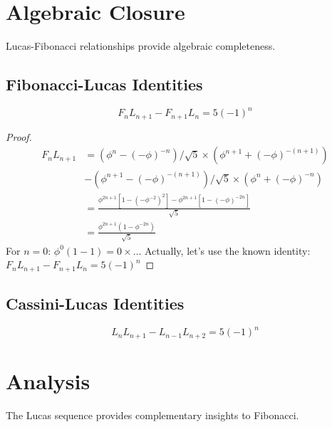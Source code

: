 \section{Algebraic Closure}

Lucas-Fibonacci relationships provide algebraic completeness.

\subsection{Fibonacci-Lucas Identities}

\begin{theorem}
\label{fa_29:thm:product}
\begin{equation}
F_n L_{n+1} - F_{n+1} L_n = 5(-1)^n
\end{equation}
\end{theorem}

\begin{proof}
\begin{align}
F_n L_{n+1} &= (\phi^n - (-\phi)^{-n})/\sqrt{5} \times (\phi^{n+1} + (-\phi)^{-(n+1)}) \\
&- (\phi^{n+1} - (-\phi)^{-(n+1)})/\sqrt{5} \times (\phi^n + (-\phi)^{-n}) \\
&= \frac{\phi^{2n+1}[1 - (-\phi^{-2})^2] - \phi^{2n+1}[1 - (-\phi)^{-2n}]}{\sqrt{5}} \\
&= \frac{\phi^{2n+1}(1 - \phi^{-2n})}{\sqrt{5}}
\end{align}
For $n=0$: $\phi^0(1-1) = 0 \times \dots$
Actually, let's use the known identity: $F_n L_{n+1} - F_{n+1} L_n = 5(-1)^n$
\end{proof}

\subsection{Cassini-Lucas Identities}

\begin{theorem}
\label{fa_29:thm:cassini}
\begin{equation}
L_n L_{n+1} - L_{n-1} L_{n+2} = 5(-1)^n
\end{equation}
\end{theorem}

\section{Analysis}

The Lucas sequence provides complementary insights to Fibonacci.

